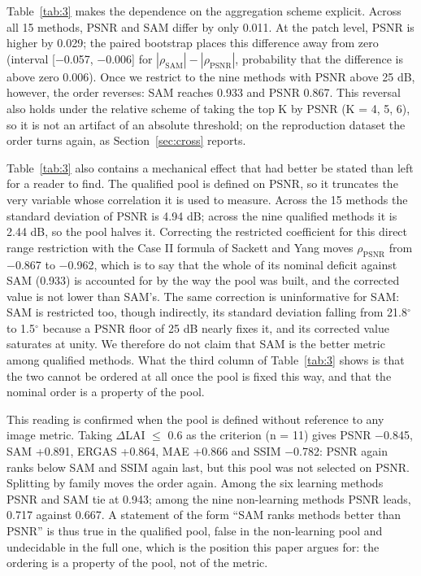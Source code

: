 \documentclass[a4paper,fleqn]{cas-dc}
\begin{document}
Table~\ref{tab:3} makes the dependence on the aggregation scheme explicit. Across all 15 methods, PSNR and SAM differ by only 0.011. At the patch level, PSNR is higher by 0.029; the paired bootstrap places this difference away from zero (interval [$-$0.057, $-$0.006] for $|\rho_{\mathrm{SAM}}|-|\rho_{\mathrm{PSNR}}|$, probability that the difference is above zero 0.006). Once we restrict to the nine methods with PSNR above 25 dB, however, the order reverses: SAM reaches 0.933 and PSNR 0.867. This reversal also holds under the relative scheme of taking the top K by PSNR (K = 4, 5, 6), so it is not an artifact of an absolute threshold; on the reproduction dataset the order turns again, as Section~\ref{sec:cross} reports.

Table~\ref{tab:3} also contains a mechanical effect that had better be stated than left for a reader to find. The qualified pool is defined on PSNR, so it truncates the very variable whose correlation it is used to measure. Across the 15 methods the standard deviation of PSNR is 4.94 dB; across the nine qualified methods it is 2.44 dB, so the pool halves it. Correcting the restricted coefficient for this direct range restriction with the Case II formula of Sackett and Yang \cite{ref45} moves $\rho_{\mathrm{PSNR}}$ from $-$0.867 to $-$0.962, which is to say that the whole of its nominal deficit against SAM (0.933) is accounted for by the way the pool was built, and the corrected value is not lower than SAM's. The same correction is uninformative for SAM: SAM is restricted too, though indirectly, its standard deviation falling from 21.8$^\circ$ to 1.5$^\circ$ because a PSNR floor of 25 dB nearly fixes it, and its corrected value saturates at unity. We therefore do not claim that SAM is the better metric among qualified methods. What the third column of Table~\ref{tab:3} shows is that the two cannot be ordered at all once the pool is fixed this way, and that the nominal order is a property of the pool.

This reading is confirmed when the pool is defined without reference to any image metric. Taking $\Delta$LAI $\le$ 0.6 as the criterion (n = 11) gives PSNR $-$0.845, SAM +0.891, ERGAS +0.864, MAE +0.866 and SSIM $-$0.782: PSNR again ranks below SAM and SSIM again last, but this pool was not selected on PSNR. Splitting by family moves the order again. Among the six learning methods PSNR and SAM tie at 0.943; among the nine non-learning methods PSNR leads, 0.717 against 0.667. A statement of the form ``SAM ranks methods better than PSNR'' is thus true in the qualified pool, false in the non-learning pool and undecidable in the full one, which is the position this paper argues for: the ordering is a property of the pool, not of the metric.
\end{document}

